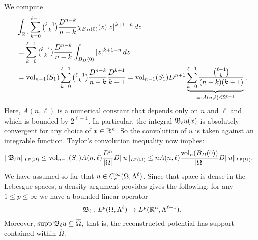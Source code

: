 \documentclass[a4paper]{article}
\begin{document}
We compute 
\begin{align*}
    &
    \int_{{\mathbb R}^{n}} \sum_{k=0}^{\ell-1} \tbinom{\ell-1}{k} \frac{ D^{n-k} }{n-k} \chi_{B_D(0)}(z) |z|^{k+1-n} \,dz
    \\&
    =
    \sum_{k=0}^{\ell-1} \tbinom{\ell-1}{k} \frac{ D^{n-k} }{n-k} \int_{B_D(0)} |z|^{k+1-n} \,dz
    \\&
    =
    \operatorname{vol}_{n-1}(S_1) \sum_{k=0}^{\ell-1} \tbinom{\ell-1}{k} \frac{ D^{n-k} }{n-k} \frac{D^{k+1}}{k+1}
    =
    \operatorname{vol}_{n-1}(S_1) D^{n+1} \underbrace{ \sum_{k=0}^{\ell-1} \frac{ \tbinom{\ell-1}{k} }{ (n-k)(k+1) } }_{ =: A(n,\ell) \leq 2^{\ell-1}}
    .
\end{align*}
Here, $A(n,\ell)$ is a numerical constant that depends only on $n$ and $\ell$ 
and which is bounded by $2^{\ell-1}$. 
In particular, the integral ${\mathfrak B}_{\ell} u(x)$ is absolutely convergent for any choice of $x \in {\mathbb R}^{n}$. 
So the convolution of $u$ is taken against an integrable function. 
Taylor's convolution inequality now implies: 
\begin{align*}
    \| {\mathfrak B}_{\ell} u \|_{L^{p}(\Omega)}
    &\leq 
    \operatorname{vol}_{n-1}(S_1) A(n,\ell) \frac{ D^{n} }{|\Omega|} 
    D
    \| u \|_{L^{p}(\Omega)}
    \leq 
    n A(n,\ell) \frac{ \operatorname{vol}_{n}(B_D(0)) }{|\Omega|} 
    D
    \| u \|_{L^{p}(\Omega)}
    .
\end{align*}
We have assumed so far that $u \in C^{\infty}_{c}(\Omega,\Lambda^{\ell})$. 
Since that space is dense in the Lebesgue spaces, a density argument provides gives the following: 
for any $1 \leq p \leq \infty$ we have a bounded linear operator 
\[
    {\mathfrak B}_{\ell} : L^{p}(\Omega,\Lambda^{\ell}) \rightarrow L^{p}({\mathbb R}^n,\Lambda^{\ell-1}).
\]
Moreover, $\operatorname{supp} {\mathfrak B}_{\ell} u \subseteq \overline\Omega$,
that is, the reconstructed potential has support contained within $\overline\Omega$. 
\end{document}
